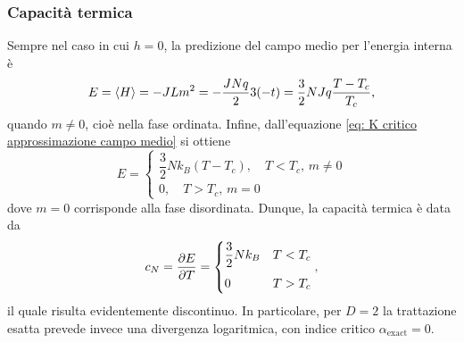 \subsubsection{Capacità termica}
Sempre nel caso in cui $h=0$, la predizione del campo medio per l'energia interna è
\begin{equation}
    E = \langle H \rangle = -J L m^2 = -\frac{J N q}{2} 3(-t) = \frac{3}{2} N J q \frac{T-T_c}{T_c},
\end{equation}
quando $m \neq 0$, cioè nella fase ordinata. Infine, dall'equazione \eqref{eq: K critico approssimazione campo medio} si ottiene
\begin{equation}
    E = 
    \begin{cases}
        \dfrac{3}{2} N k_B (T-T_c), \quad T < T_c,\,m\neq 0 \\[2ex]
        0, \quad T > T_c,\,m = 0
    \end{cases}
\end{equation}
dove $m = 0$ corrisponde alla fase disordinata. Dunque, la capacità termica è data da
\begin{equation}
    c_N = \frac{\partial E}{\partial T} =
    \begin{cases}
        \dfrac{3}{2} N k_B & T<T_c \\[2ex]
        0 & T>T_c
    \end{cases},
\end{equation}
il quale risulta evidentemente discontinuo. In particolare, per $D = 2$ la trattazione esatta prevede invece una divergenza logaritmica, con indice critico $\alpha_{\mathrm{exact}} = 0$.

